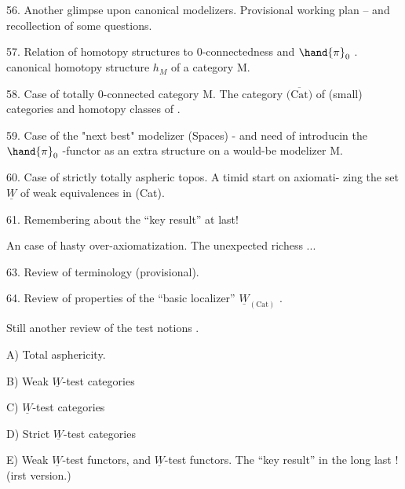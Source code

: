 56. Another glimpse upon canonical modelizers. Provisional working
plan -- and recollection of some questions.

57. Relation of homotopy structures to 0-connectedness and $\hand{\pi}_0$ . 
canonical homotopy structure $h_M$ of a category M.

58. Case of totally 0-connected category M. The category $\overline{\text{(Cat)}}$ of
(small) categories and homotopy classes of .

59. Case of the "next best" modelizer (Spaces) - and need of introducin
the $\hand{\pi}_0$ -functor as an extra structure\unsure{*} on a would-be modelizer M.

60. Case of  strictly totally aspheric topos. A timid start on axiomati-%
zing the set $\underline{W}$ of weak equivalences in (Cat).

61. Remembering about the  ``key result'' at last!

\hand{\textcircled{\textcolor{black}{62.}}} An  case of hasty over-axiomatization. The unexpected richess ...

63. Review of terminology (provisional).

64. Review of properties of the ``basic localizer'' $\underline{W}_{(\text{Cat})}$ .

\hand{\textcircled{\textcolor{black}{65.}}} Still another review of the test notions .

A) Total asphericity.

B) Weak $\underline{W}$-test categories

C) $\underline{W}$-test categories

D) Strict $\underline{W}$-test categories

E) Weak $\underline{W}$-test functors, and $\underline{W}$-test functors. The ``key result'' in
the long last ! (irst version\hand{\unsure{)}}.) 

